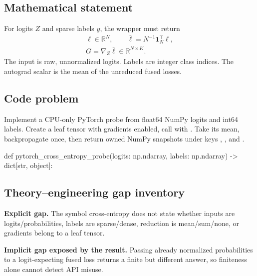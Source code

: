 
        \subsection{Mathematical statement}


For logits $Z$ and sparse labels $y$, the wrapper must return
\[
\begin{gathered}
\bm\ell\in\mathbb R^N,\qquad
\bar\ell=N^{-1}\bm1_N^\top\bm\ell,\\
G=\nabla_Z\bar\ell\in\mathbb R^{N\times K}.
\end{gathered}
\]
The input is raw, unnormalized logits.  Labels are integer class indices.  The
autograd scalar is the mean of the unreduced fused losses.


        \subsection{Code problem}


Implement a CPU-only PyTorch probe from float64 NumPy logits and int64 labels.
Create a leaf tensor with gradients enabled, call
 with .\newline
Take its mean, backpropagate once, then return owned NumPy snapshots under keys ,
, and .


        \begin{contractbox}
        \begin{Code}
        def pytorch_cross_entropy_probe(logits: np.ndarray, labels: np.ndarray) -> dict[str, object]:
        \end{Code}
        \end{contractbox}

        \subsection{Theory--engineering gap inventory}

        \begin{gapbox}
        \textbf{Explicit gap.} The symbol cross-entropy does not state whether inputs are logits/probabilities, labels are sparse/dense, reduction is mean/sum/none, or gradients belong to a leaf tensor.

        \textbf{Implicit gap exposed by the result.} Passing already normalized probabilities to a logit-expecting fused loss returns a finite but different answer, so finiteness alone cannot detect API misuse.
        \end{gapbox}

